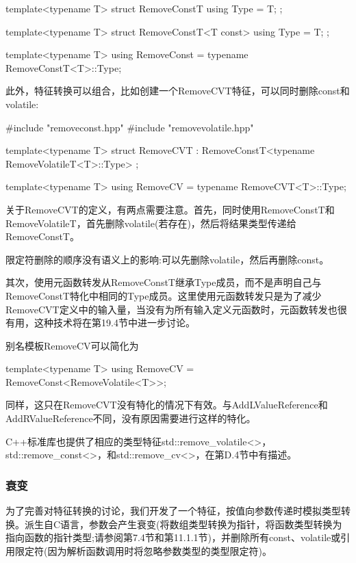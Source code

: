 \begin{cpp}
template<typename T>
struct RemoveConstT {
	using Type = T;
};

template<typename T>
struct RemoveConstT<T const> {
	using Type = T;
};

template<typename T>
using RemoveConst = typename RemoveConstT<T>::Type;
\end{cpp}

此外，特征转换可以组合，比如创建一个RemoveCVT特征，可以同时删除const和volatile:

\begin{cpp}
#include "removeconst.hpp"
#include "removevolatile.hpp"

template<typename T>
struct RemoveCVT : RemoveConstT<typename RemoveVolatileT<T>::Type> {
};

template<typename T>
using RemoveCV = typename RemoveCVT<T>::Type;
\end{cpp}

关于RemoveCVT的定义，有两点需要注意。首先，同时使用RemoveConstT和RemoveVolatileT，首先删除volatile(若存在)，然后将结果类型传递给RemoveConstT。

\begin{notice}
限定符删除的顺序没有语义上的影响:可以先删除volatile，然后再删除const。
\end{notice}

其次，使用元函数转发从RemoveConstT继承Type成员，而不是声明自己与RemoveConstT特化中相同的Type成员。这里使用元函数转发只是为了减少RemoveCVT定义中的输入量，当没有为所有输入定义元函数时，元函数转发也很有用，这种技术将在第19.4节中进一步讨论。

别名模板RemoveCV可以简化为

\begin{cpp}
template<typename T>
using RemoveCV = RemoveConst<RemoveVolatile<T>>;
\end{cpp}

同样，这只在RemoveCVT没有特化的情况下有效。与AddLValueReference和AddRValueReference不同，没有原因需要进行这样的特化。

C++标准库也提供了相应的类型特征std::remove\_volatile<>， std::remove\_const<>，和std::remove\_cv<>，在第D.4节中有描述。

\subsubsection{衰变}

为了完善对特征转换的讨论，我们开发了一个特征，按值向参数传递时模拟类型转换。派生自C语言，参数会产生衰变(将数组类型转换为指针，将函数类型转换为指向函数的指针类型;请参阅第7.4节和第11.1.1节)，并删除所有const、volatile或引用限定符(因为解析函数调用时将忽略参数类型的类型限定符)。

